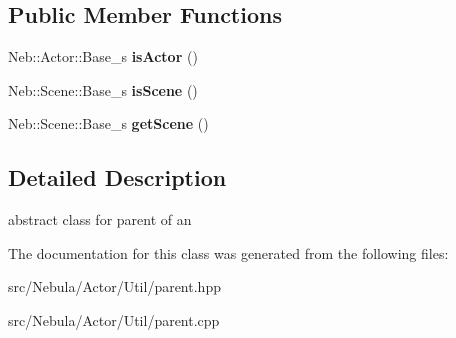 \subsection*{\-Public \-Member \-Functions}
\begin{DoxyCompactItemize}
\item 
\hypertarget{classNeb_1_1Actor_1_1parent_a008be988dfa197a878a6622314f91a93}{\-Neb\-::\-Actor\-::\-Base\-\_\-s {\bfseries is\-Actor} ()}\label{classNeb_1_1Actor_1_1parent_a008be988dfa197a878a6622314f91a93}

\item 
\hypertarget{classNeb_1_1Actor_1_1parent_a9c132ce167bbc2b99d1df0d8e1932918}{\-Neb\-::\-Scene\-::\-Base\-\_\-s {\bfseries is\-Scene} ()}\label{classNeb_1_1Actor_1_1parent_a9c132ce167bbc2b99d1df0d8e1932918}

\item 
\hypertarget{classNeb_1_1Actor_1_1parent_a39169d56c3becf729bd970e2bdd63262}{\-Neb\-::\-Scene\-::\-Base\-\_\-s {\bfseries get\-Scene} ()}\label{classNeb_1_1Actor_1_1parent_a39169d56c3becf729bd970e2bdd63262}

\end{DoxyCompactItemize}


\subsection{\-Detailed \-Description}
abstract class for parent of an  

\-The documentation for this class was generated from the following files\-:\begin{DoxyCompactItemize}
\item 
src/\-Nebula/\-Actor/\-Util/parent.\-hpp\item 
src/\-Nebula/\-Actor/\-Util/parent.\-cpp\end{DoxyCompactItemize}
